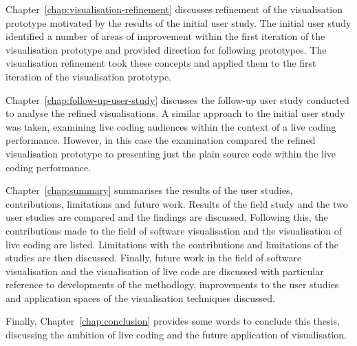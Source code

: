 Chapter~\ref{chap:visualisation-refinement} discusses refinement of the visualisation prototype motivated by the results of the initial user study. The initial user study identified a number of areas of improvement within the first iteration of the visualisation prototype and provided direction for following prototypes. The visualisation refinement took these concepts and applied them to the first iteration of the visualisation prototype.

Chapter~\ref{chap:follow-up-user-study} discusses the follow-up user study conducted to analyse the refined visualisations. A similar approach to the initial user study was taken, examining live coding audiences within the context of a live coding performance. However, in this case the examination compared the refined visualisation prototype to presenting just the plain source code within the live coding performance.

Chapter~\ref{chap:summary} summarises the results of the user studies, contributions, limitations and future work. Results of the field study and the two user studies are compared and the findings are discussed. Following this, the contributions made to the field of software visualisation and the visualisation of live coding are listed. Limitations with the contributions and limitations of the studies are then discussed. Finally, future work in the field of software visualisation and the visualisation of live code are discussed with particular reference to developments of the methodlogy, improvements to the user studies and application spaces of the visualisation techniques discussed.

Finally, Chapter~\ref{chap:conclusion} provides some words to conclude this thesis, discussing the ambition of live coding and the future application of visualisation.

